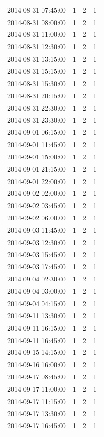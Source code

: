 \begin{tabular}{lrrr}
2014-08-31 07:45:00 & 1 & 2 & 1 \\
2014-08-31 08:00:00 & 1 & 2 & 1 \\
2014-08-31 11:00:00 & 1 & 2 & 1 \\
2014-08-31 12:30:00 & 1 & 2 & 1 \\
2014-08-31 13:15:00 & 1 & 2 & 1 \\
2014-08-31 15:15:00 & 1 & 2 & 1 \\
2014-08-31 15:30:00 & 1 & 2 & 1 \\
2014-08-31 20:15:00 & 1 & 2 & 1 \\
2014-08-31 22:30:00 & 1 & 2 & 1 \\
2014-08-31 23:30:00 & 1 & 2 & 1 \\
2014-09-01 06:15:00 & 1 & 2 & 1 \\
2014-09-01 11:45:00 & 1 & 2 & 1 \\
2014-09-01 15:00:00 & 1 & 2 & 1 \\
2014-09-01 21:15:00 & 1 & 2 & 1 \\
2014-09-01 22:00:00 & 1 & 2 & 1 \\
2014-09-02 02:00:00 & 1 & 2 & 1 \\
2014-09-02 03:45:00 & 1 & 2 & 1 \\
2014-09-02 06:00:00 & 1 & 2 & 1 \\
2014-09-03 11:45:00 & 1 & 2 & 1 \\
2014-09-03 12:30:00 & 1 & 2 & 1 \\
2014-09-03 15:45:00 & 1 & 2 & 1 \\
2014-09-03 17:45:00 & 1 & 2 & 1 \\
2014-09-04 02:30:00 & 1 & 2 & 1 \\
2014-09-04 03:00:00 & 1 & 2 & 1 \\
2014-09-04 04:15:00 & 1 & 2 & 1 \\
2014-09-11 13:30:00 & 1 & 2 & 1 \\
2014-09-11 16:15:00 & 1 & 2 & 1 \\
2014-09-11 16:45:00 & 1 & 2 & 1 \\
2014-09-15 14:15:00 & 1 & 2 & 1 \\
2014-09-16 16:00:00 & 1 & 2 & 1 \\
2014-09-17 08:45:00 & 1 & 2 & 1 \\
2014-09-17 11:00:00 & 1 & 2 & 1 \\
2014-09-17 11:15:00 & 1 & 2 & 1 \\
2014-09-17 13:30:00 & 1 & 2 & 1 \\
2014-09-17 16:45:00 & 1 & 2 & 1 \\

\end{tabular}
